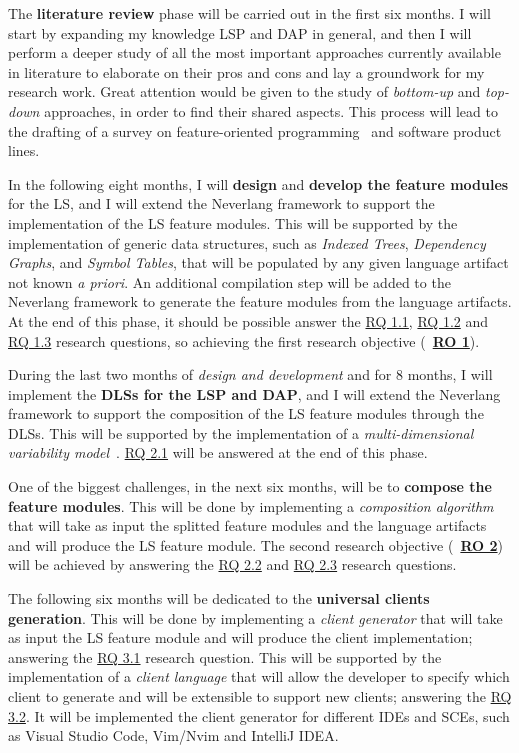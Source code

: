 The \textbf{literature review} phase will be carried out in the first six months. I will start by expanding my knowledge LSP and DAP in general, and then I will perform a deeper study of all the most important approaches currently available in literature to elaborate on their pros and cons and lay a groundwork for my research work. Great attention would be given to the study of \textit{bottom-up} and \textit{top-down} approaches, in order to find their shared aspects. This process will lead to the drafting of a survey on feature-oriented programming~\cite{Prehofer97} and software product lines.

In the following eight months, I will \textbf{design} and \textbf{develop the feature modules} for the LS, and I will extend the Neverlang framework to support the implementation of the LS feature modules. This will be supported by the implementation of generic data structures, such as \textit{Indexed Trees}, \textit{Dependency Graphs}, and \textit{Symbol Tables}, that will be populated by any given language artifact not known \textit{a priori}. An additional compilation step will be added to the Neverlang framework to generate the feature modules from the language artifacts. At the end of this phase, it should be possible answer the \hyperlink{rq11}{\textsf{RQ 1.1}}, \hyperlink{rq12}{\textsf{RQ 1.2}} and \hyperlink{rq13}{\textsf{RQ 1.3}} research questions, so achieving the first research objective (~\hyperlink{ro1}{\textbf{RO 1}}).

During the last two months of \textit{design and development} and for 8 months, I will implement the \textbf{DLSs for the LSP and DAP}, and I will extend the Neverlang framework to support the composition of the LS feature modules through the DLSs. This will be supported by the implementation of a \textit{multi-dimensional variability model}~\cite{Rosenmuller11}. \hyperlink{rq21}{\textsf{RQ 2.1}} will be answered at the end of this phase.

One of the biggest challenges, in the next six months, will be to \textbf{compose the feature modules}. This will be done by implementing a \textit{composition algorithm} that will take as input the splitted feature modules and the language artifacts and will produce the LS feature module. The second research objective (~\hyperlink{ro2}{\textbf{RO 2}}) will be achieved by answering the \hyperlink{rq22}{\textsf{RQ 2.2}} and \hyperlink{rq23}{\textsf{RQ 2.3}} research questions.

The following six months will be dedicated to the \textbf{universal clients generation}. This will be done by implementing a \textit{client generator} that will take as input the LS feature module and will produce the client implementation; answering the \hyperlink{rq31}{\textsf{RQ 3.1}} research question. This will be supported by the implementation of a \textit{client language} that will allow the developer to specify which client to generate and will be extensible to support new clients; answering the \hyperlink{rq31}{\textsf{RQ 3.2}}. It will be implemented the client generator for different IDEs and SCEs, such as Visual Studio Code, Vim/Nvim and IntelliJ IDEA.

